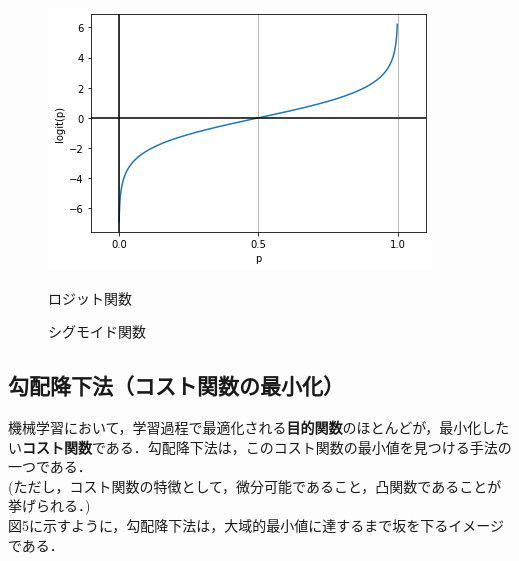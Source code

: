\documentclass[a4j, 11pt]{jsarticle}
\numberwithin{equation}{section}
\begin{document}
\begin{figure}[htbp]
  \begin{minipage}[b]{0.5\linewidth}
    \centering
    \mbox{{\includegraphics[scale=0.5]{fig3_logit.png}}}
    \caption{ロジット関数}
    \label{ロジット}
  \end{minipage}
  \begin{minipage}[b]{0.5\linewidth} 
    \centering
     \mbox{}
    \caption{シグモイド関数}
  \end{minipage}
\end{figure}

\subsection{勾配降下法（コスト関数の最小化）}
\indent 機械学習において，学習過程で最適化される\textbf{目的関数}のほとんどが，最小化したい\textbf{コスト関数}である．勾配降下法は，このコスト関数の最小値を見つける手法の一つである．\\
(ただし，コスト関数の特徴として，微分可能であること，凸関数であることが挙げられる．)\\
\indent 図5に示すように，勾配降下法は，大域的最小値に達するまで坂を下るイメージである．\\
\end{document}
